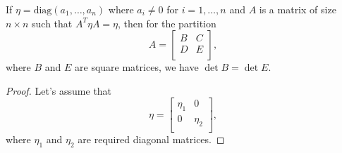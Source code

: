 \documentclass[main.tex]{subfiles}
\begin{document}
\begin{theorem}
If $\eta = \text{diag}(a_1, \dots, a_n)$ where $a_i\not=0$ for $i=1, \dots, n$ and $A$ is a matrix of size $n\times n$ such that 
$A^T\eta A = \eta$, then for the partition
\begin{equation}
A = \begin{bmatrix}
    B &  C \\
    D & E \\
\end{bmatrix},
\end{equation}
where $B$ and $E$ are square matrices, we have $\det B = \det E$.
\end{theorem}
\begin{proof}
Let's assume that 
\begin{equation}
\eta = \begin{bmatrix}
    \eta_1 &  0 \\
    0 & \eta_2 \\
\end{bmatrix},
\end{equation}
where $\eta_1$ and $\eta_2$ are required diagonal matrices.


\end{proof}
\end{document}
